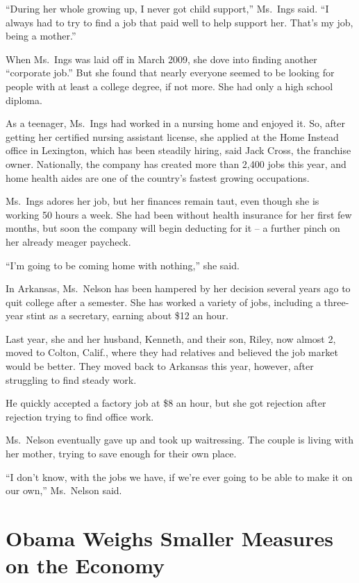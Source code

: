 ﻿\documentclass[12pt]{article}
\begin{document}
``During her whole growing up, I never got child support,'' Ms.~Ings said. ``I always had to try to
find a job that paid well to help support her. That's my job, being a mother.''

When Ms.~Ings was laid off in March 2009, she dove into finding another ``corporate job.'' But she
found that nearly everyone seemed to be looking for people with at least a college degree, if not
more. She had only a high school diploma.

As a teenager, Ms.~Ings had worked in a nursing home and enjoyed it. So, after getting her certified
nursing assistant license, she applied at the Home Instead office in Lexington, which has been
steadily hiring, said Jack Cross, the franchise owner. Nationally, the company has created more than
2,400 jobs this year, and home health aides are one of the country's fastest growing occupations.

Ms.~Ings adores her job, but her finances remain taut, even though she is working 50 hours a week.
She had been without health insurance for her first few months, but soon the company will begin
deducting for it -- a further pinch on her already meager paycheck.

``I'm going to be coming home with nothing,'' she said.

In Arkansas, Ms.~Nelson has been hampered by her decision several years ago to quit college after a
semester. She has worked a variety of jobs, including a three-year stint as a secretary, earning
about \$12 an hour.

Last year, she and her husband, Kenneth, and their son, Riley, now almost 2, moved to Colton,
Calif., where they had relatives and believed the job market would be better. They moved back to
Arkansas this year, however, after struggling to find steady work.

He quickly accepted a factory job at \$8 an hour, but she got rejection after rejection trying to
find office work.

Ms.~Nelson eventually gave up and took up waitressing. The couple is living with her mother, trying
to save enough for their own place.

``I don't know, with the jobs we have, if we're ever going to be able to make it on our own,''
Ms.~Nelson said.

\pagebreak
\section{Obama Weighs Smaller Measures on the Economy}
\end{document}
